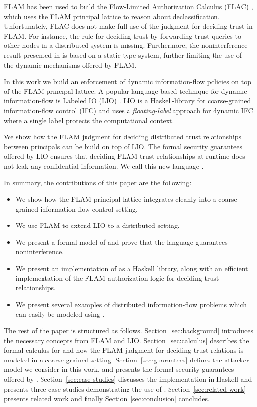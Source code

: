 FLAM has been used to build the Flow-Limited Authorization Calculus (FLAC) \cite{7536372}, which uses the FLAM principal lattice to reason about declassification. Unfortunately, FLAC does not make full use of the judgment for deciding trust in FLAM. For instance, the rule for deciding trust by forwarding trust queries to other nodes in a distributed system is missing. Furthermore, the noninterference result presented in \cite{7536372} is based on a static type-system, further limiting the use of the dynamic mechanisms offered by FLAM.

In this work we build an enforcement of dynamic information-flow policies on top of the FLAM principal lattice. A popular language-based technique for dynamic information-flow is Labeled IO (LIO) \cite{SRMMlio}. LIO is a Haskell-library for coarse-grained information-flow control (IFC) and uses a \emph{floating-label} approach for dynamic IFC where a single label protects the computational context.

We show how the FLAM judgment for deciding distributed trust relationships between principals can be build on top of LIO. The formal security guarantees offered by LIO ensures that deciding FLAM trust relationships at runtime does not leak any confidential information. We call this new language \lang.

In summary, the contributions of this paper are the following:
\begin{itemize}
    \item We show how the FLAM principal lattice integrates cleanly into a coarse-grained information-flow control setting.
    \item We use FLAM to extend LIO to a distributed setting.
    \item We present a formal model of \lang{} and prove that the language guarantees noninterference.
    \item We present an implementation of \lang{} as a Haskell library, along with an efficient implementation of the FLAM authorization logic for deciding trust relationships.
    \item We present several examples of distributed information-flow problems which can easily be modeled using \lang.
\end{itemize}

The rest of the paper is structured as follows. Section~\ref{sec:background} introduces the necessary concepts from FLAM and LIO. Section~\ref{sec:calculus} describes the formal calculus for \lang{} and how the FLAM judgment for deciding trust relations is modeled in a coarse-grained setting. Section~\ref{sec:guarantees} defines the attacker model we consider in this work, and presents the formal security guarantees offered by \lang. Section~\ref{sec:case-studies} discusses the implementation in Haskell and presents three case studies demonstrating the use of \lang. Section~\ref{sec:related-work} presents related work and finally Section~\ref{sec:conclusion} concludes.